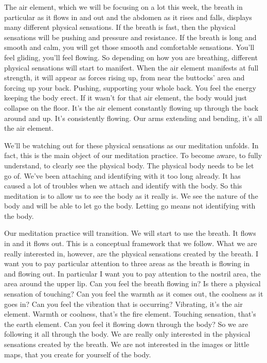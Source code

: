 \documentclass[letterpaper,10pt,english]{sphinxmanual}
\begin{document}
\sphinxAtStartPar
The  air  element,  which  we  will  be  focusing  on  a  lot  this  week,  the
breath  in  particular  as  it  flows  in  and  out  and  the  abdomen  as  it  rises  and
falls, displays many different physical sensations. If the breath is fast, then
the physical sensations will be pushing and pressure and resistance. If the
breath is long and smooth and calm, you will get those smooth and comfortable sensations. You’ll feel gliding, you’ll feel flowing. So depending on how
you are breathing, different physical sensations will start to manifest. When
the air element manifests at full strength, it will appear as forces rising up,
from near the buttocks’ area and forcing up your back. Pushing, supporting
your whole back. You feel the energy keeping the body erect. If it wasn’t for
that air element, the body would just collapse on the floor. It’s the air element
constantly flowing up through the back around and up. It’s consistently flowing. Our arms extending and bending, it’s all the air element.

\sphinxAtStartPar
We’ll be watching out for these physical sensations as our meditation
unfolds. In fact, this is the main object of our meditation practice. To become
aware,  to  fully  understand,  to  clearly  see  the  physical  body.  The  physical
body needs to be let go of. We’ve been attaching and identifying with it too
long already. It has caused a lot of troubles when we attach and identify with
the body. So this meditation is to allow us to see the body as it really is. We
see  the  nature  of  the  body  and  will  be  able  to  let  go  the  body.  Letting  go
means not identifying with the body.

\sphinxAtStartPar
Our meditation practice will transition. We will start to use the breath.
It flows in and it flows out. This is a conceptual framework that we follow.
What we are really interested in, however, are the physical sensations created by the breath. I want you to pay particular attention to three areas as
the  breath  is  flowing  in  and  flowing  out.  In  particular  I  want  you  to  pay
  attention to the nostril area, the area around the upper lip. Can you feel the
breath flowing in? Is there a physical sensation of touching? Can you feel the
warmth as it comes out, the coolness as it goes in? Can you feel the vibration
that is occurring? Vibrating, it’s the air element. Warmth or coolness, that’s
the fire element. Touching sensation, that’s the earth element. Can you feel
it  flowing  down  through  the  body?  So  we  are  following  it  all  through  the
body. We are really only interested in the physical sensations created by the
breath. We are not interested in the images or little maps, that you create for
yourself of the body.
\end{document}
